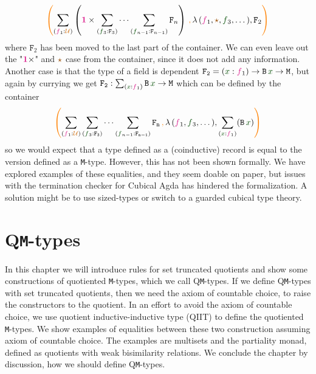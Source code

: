 \documentclass[twoside,11pt,openright]{report}
\theoremstyle{plain} %
\theoremstyle{definition}
\theoremstyle{remark}
\newcommand*{\term}[1]{\textcolor{green!30!black}{#1}} %
\newcommand*{\type}[1]{\textcolor{magenta!90!black}{#1}}
\newcommand*{\containerpair}[2]{\ensuremath{\colorlet{savedleftcolor}{.}\color{orange}\left(\color{savedleftcolor}#1\,\textcolor{orange}{\mathbf{,}}\,#2\color{orange}\right)\color{savedleftcolor}}}
\newcommand*{\universe}[1]{\textcolor{orange!80!black}{#1}}
\newcommand*{\unit}{\type{\textbf{1}}}
\newcommand*{\constant}[1]{\textcolor{orange!60!black}{\ensuremath{\mathtt{#1}}}}
\newcommand*{\typeformer}[1]{\ensuremath{\mathtt{#1}}}
\newcommand*{\unitelem}{\constant{\star}} %
\begin{document}
\begin{equation}
  \containerpair{\sum_{(\type{f}_1 : \universe{\mathcal{U}})} \left(\unit \times \sum_{(\term{f}_3 : \typeformer{F}_3)} \cdots \sum_{(\term{f}_{n-1} : \typeformer{F}_{n-1})}\typeformer{F}_n\right)}{\lambda\,(\type{f}_1,\unitelem,\term{f}_3,\dots),\typeformer{F}_2}
\end{equation}
where \(\typeformer{F}_2\) has been moved to the last part of the container. We can even leave out the "\(\unit \times\)" and \(\unitelem\) case from the container, since it does not add any information. Another case is that the type of a field is dependent \(\typeformer{F_2} = (\term{x} : \type{f}_1) \rightarrow \typeformer{B}\,\term{x} \rightarrow \typeformer{M}\), but again by currying we get \(\typeformer{F_2} : \sum_{(\term{x} : \type{f}_1)} \typeformer{B}\,\term{x} \rightarrow \mathtt{M}\) which can be defined by the container
\begin{equation}
  \containerpair{\sum_{(\type{f}_1 : \universe{\mathcal{U}})} \sum_{(\term{f}_3 : \typeformer{F_3})} \cdots \sum_{(\term{f}_{n-1} : \typeformer{F_{n-1}})}\typeformer{F_n}}{\lambda\,(\type{f}_1,\term{f}_3,\dots),\sum_{(\term{x} : \type{f}_1)} (\typeformer{B}\,\term{x})}
\end{equation}
so we would expect that a type defined as a (coinductive) record is equal to the version defined as a \texttt{M}-type. However, this has not been shown formally. We have explored examples of these equalities, and they seem doable on paper, but issues with the termination checker for Cubical Agda has hindered the formalization. A solution might be to use sized-types or switch to a guarded cubical type theory.


\chapter{Q\texttt{M}-types}
\label{ch:QM-types}
In this chapter we will introduce rules for set truncated quotients and show some constructions of quotiented \texttt{M}-types, which we call Q\texttt{M}-types. If we define Q\texttt{M}-types with set truncated quotients, then we need the axiom of countable choice, to raise the constructors to the quotient. In an effort to avoid the axiom of countable choice, we use quotient inductive-inductive type (QIIT) \cite{DBLP:QIIT} to define the quotiented \texttt{M}-types. We show examples of equalities between these two construction assuming axiom of countable choice. The examples are multisets and the partiality monad, defined as quotients with weak bisimilarity relations. We conclude the chapter by discussion, how we should define Q\texttt{M}-types.
\end{document}
